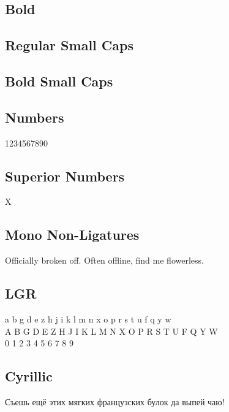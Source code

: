 \documentclass{article}
\begin{document}
\subsection*{Bold}

\textbf{\lipsum[2]}

\subsection*{Regular Small Caps}
\textsc{\lipsum[1]}

\subsection*{Bold Small Caps}

\textsc{\textbf{\lipsum[3]}}


\subsection*{Numbers}

1234567890

\subsection*{Superior Numbers}

X

\subsection*{Mono Non-Ligatures}


Officially broken off. Often offline, find me flowerless.


\subsection*{LGR}

{\notomonolgr\noindent
 a b g d e z h j i k l m n x o p r s t u f q y w\\
 A B G D E Z H J I K L M N X O P R S T U F Q Y W\\
 0 1 2 3 4 5 6 7 8 9
}

\subsection*{Cyrillic}

{\ifxetex\else\ifluatex\else{}\selectfont\fi\fi
Съешь ещё этих мягких французских булок да
выпей чаю!}
\end{document}

